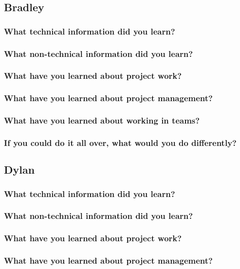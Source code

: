 \documentclass[onecolumn, draftclsnofoot,10pt, compsoc]{IEEEtran}
\begin{document}
  \subsection{Bradley}
    \subsubsection{What technical information did you learn?}
    \subsubsection{What non-technical information did you learn?}
    \subsubsection{What have you learned about project work?}
    \subsubsection{What have you learned about project management?}
    \subsubsection{What have you learned about working in teams?}
    \subsubsection{\textbf{If you could do it all over, what would you do differently?}}
  \newpage

  \subsection{Dylan}
    \subsubsection{What technical information did you learn?}
    \subsubsection{What non-technical information did you learn?}
    \subsubsection{What have you learned about project work?}
    \subsubsection{What have you learned about project management?}
\end{document}
